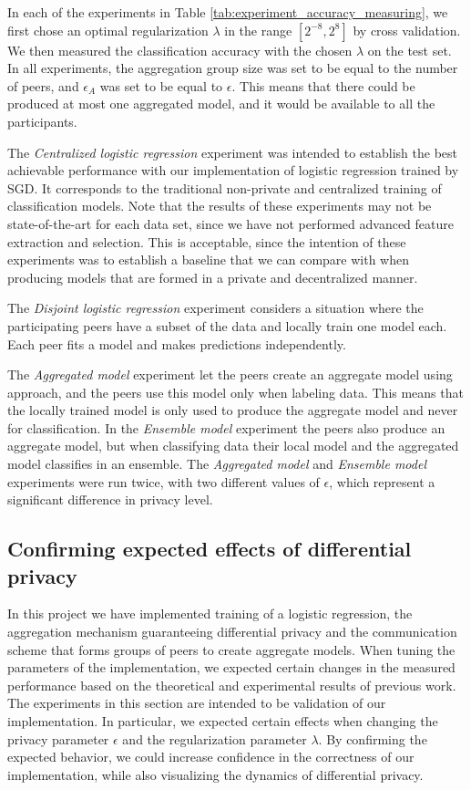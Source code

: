 In each of the experiments in Table \ref{tab:experiment_accuracy_measuring}, we first chose an optimal regularization $\lambda$ in the range $[2^{-8}, 2^8]$ by cross validation. We then measured the classification accuracy with the chosen $\lambda$ on the test set. In all experiments, the aggregation group size was set to be equal to the number of peers, and $\epsilon_{A}$ was set to be equal to $\epsilon$. This means that there could be produced at most one aggregated model, and it would be available to all the participants.

The \textit{Centralized logistic regression} experiment was intended to establish the best achievable performance with our implementation of logistic regression trained by SGD. It corresponds to the traditional non-private and centralized training of classification models. Note that the results of these experiments may not be state-of-the-art for each data set, since we have not performed advanced feature extraction and selection. This is acceptable, since the intention of these experiments was to establish a baseline that we can compare with when producing models that are formed in a private and decentralized manner. 

The \textit{Disjoint logistic regression} experiment considers a situation where the participating peers have a subset of the data and locally train one model each. Each peer fits a model and makes predictions independently.

The \textit{Aggregated model} experiment let the peers create an aggregate model using \cite{pathak2010diffprivhomo} approach, and the peers use this model only when labeling data. This means that the locally trained model is only used to produce the aggregate model and never for classification. In the \textit{Ensemble model} experiment the peers also produce an aggregate model, but when classifying data their local model and the aggregated model classifies in an ensemble. The \textit{Aggregated model} and \textit{Ensemble model} experiments were run twice, with two different values of $\epsilon$, which represent a significant difference in privacy level.

\subsection{Confirming expected effects of differential privacy}

In this project we have implemented training of a logistic regression, the aggregation mechanism guaranteeing differential privacy and the communication scheme that forms groups of peers to create aggregate models. When tuning the parameters of the implementation, we expected certain changes in the measured performance based on the theoretical and experimental results of previous work. The experiments in this section are intended to be validation of our implementation. In particular, we expected certain effects when changing the privacy parameter $\epsilon$ and the regularization parameter $\lambda$. By confirming the expected behavior, we could increase confidence in the correctness of our implementation, while also visualizing the dynamics of differential privacy.

